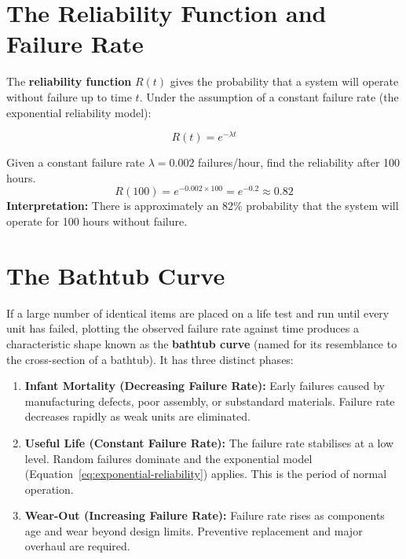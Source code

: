 \documentclass[12pt,a4paper]{article}
\begin{document}
\section{The Reliability Function and Failure Rate}

The \textbf{reliability function} $R(t)$ gives the probability that a system will operate without failure up to time $t$. Under the assumption of a constant failure rate (the exponential reliability model):

\begin{equation}
R(t) = e^{-\lambda t}
\label{eq:exponential-reliability}
\end{equation}

\begin{example}
Given a constant failure rate $\lambda = 0.002$ failures/hour, find the reliability after 100 hours.
\[
R(100) = e^{-0.002 \times 100} = e^{-0.2} \approx 0.82
\]
\textbf{Interpretation:} There is approximately an 82\% probability that the system will operate for 100 hours without failure.
\end{example}

\section{The Bathtub Curve}

If a large number of identical items are placed on a life test and run until every unit has failed, plotting the observed failure rate against time produces a characteristic shape known as the \textbf{bathtub curve} (named for its resemblance to the cross-section of a bathtub). It has three distinct phases:

\begin{enumerate}
    \item \textbf{Infant Mortality (Decreasing Failure Rate):} Early failures caused by manufacturing defects, poor assembly, or substandard materials. Failure rate decreases rapidly as weak units are eliminated.
    \item \textbf{Useful Life (Constant Failure Rate):} The failure rate stabilises at a low level. Random failures dominate and the exponential model (Equation~\ref{eq:exponential-reliability}) applies. This is the period of normal operation.
    \item \textbf{Wear-Out (Increasing Failure Rate):} Failure rate rises as components age and wear beyond design limits. Preventive replacement and major overhaul are required.
\end{enumerate}
\end{document}

